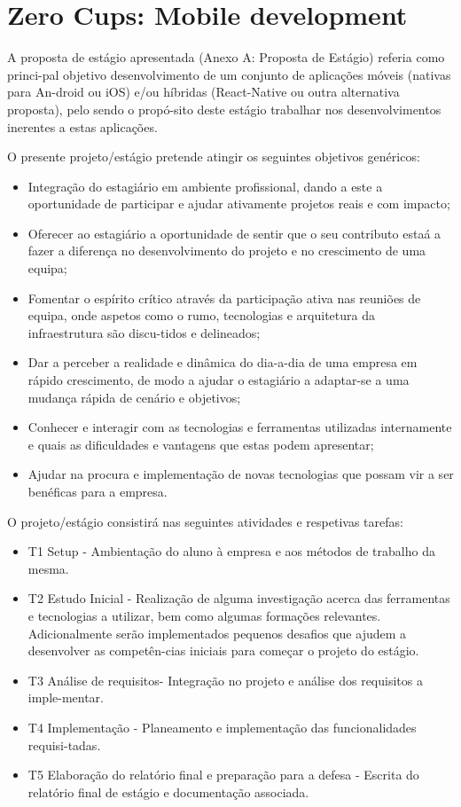\newpage
\section{Zero Cups: Mobile development}

A proposta de estágio apresentada (Anexo A: Proposta de Estágio) referia como princi-pal objetivo desenvolvimento de um conjunto de aplicações móveis (nativas para An-droid ou iOS) e/ou híbridas (React-Native ou outra alternativa proposta), pelo sendo o propó-sito deste estágio trabalhar nos desenvolvimentos inerentes a estas aplicações. 

O presente projeto/estágio pretende atingir os seguintes objetivos genéricos:

\begin{itemize}
    \item Integração do estagiário em ambiente profissional, dando a este a oportunidade de participar e ajudar
    ativamente projetos reais e com impacto;
    \item Oferecer ao estagiário a oportunidade de sentir que o seu contributo estaá a fazer a diferença no desenvolvimento do projeto e no crescimento de uma equipa;
    \item Fomentar o espírito crítico através da participação ativa nas reuniões de equipa, onde aspetos como o rumo, tecnologias e arquitetura da infraestrutura são discu-tidos e delineados;
    \item Dar a perceber a realidade e dinâmica do dia-a-dia de uma empresa em rápido crescimento, de modo a
    ajudar o estagiário a adaptar-se a uma mudança rápida de cenário e objetivos;
    \item Conhecer e interagir com as tecnologias e ferramentas utilizadas internamente e quais as dificuldades e
    vantagens que estas podem apresentar;
    \item Ajudar na procura e implementação de novas tecnologias que possam vir a ser benéficas para a empresa.
\end{itemize}

O projeto/estágio consistirá nas seguintes atividades e respetivas tarefas:

\begin{itemize}
    \item T1 Setup - Ambientação do aluno à empresa e aos métodos de trabalho da mesma.
    \item T2 Estudo Inicial - Realização de alguma investigação acerca das ferramentas e tecnologias a utilizar, bem como algumas formações relevantes. Adicionalmente serão implementados pequenos desafios que ajudem a desenvolver as competên-cias iniciais para começar o projeto do estágio.
    \item T3 Análise de requisitos- Integração no projeto e análise dos requisitos a imple-mentar.
    \item T4 Implementação - Planeamento e implementação das funcionalidades requisi-tadas.
    \item T5 Elaboração do relatório final e preparação para a defesa - Escrita do relatório final de estágio e documentação associada.
\end{itemize}


